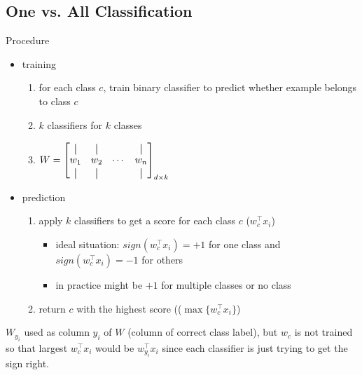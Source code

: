 \documentclass[10pt,landscape,a4paper]{article}
\newcommand*{\vertbar}{\rule[-1ex]{0.5pt}{2.5ex}}
\begin{document}
\begin{multicols*}{5}
\subsection{One vs. All Classification}
Procedure
\begin{itemize}
    \item training
    \begin{enumerate}
        \item for each class \(c\), train binary classifier to predict whether example belongs to class \(c\)
        \item \(k\) classifiers for \(k\) classes
        \item
        \(
            W =
            \begin{bmatrix}
                \vertbar & \vertbar & & \vertbar \\
                w_1 & w_2 & \cdots & w_n \\
                \vertbar & \vertbar & & \vertbar
            \end{bmatrix}_{d \times k}
        \)
    \end{enumerate}
    \item prediction
    \begin{enumerate}
        \item apply \(k\) classifiers to get a score for each class \(c\) (\(w_c^\intercal x_i\))
        \begin{itemize}
            \item ideal situation: \(sign(w_c^\intercal x_i) = +1\) for one class and \(sign(w_c^\intercal x_i) = -1\) for others
            \item in practice might be \(+1\) for multiple classes or no class
        \end{itemize}
        \item return \(c\) with the highest score ((\(\max\{w_c^\intercal x_i\}\))
    \end{enumerate}
\end{itemize}
\(W_{y_i}\) used as column \(y_i\) of \(W\) (column of correct class label), but \(w_c\) is not trained so that largest \(w_c^\intercal x_i\) would be \(w_{y_i}^\intercal x_i\) since each classifier is just trying to get the sign right.


\end{multicols*}
\end{document}
